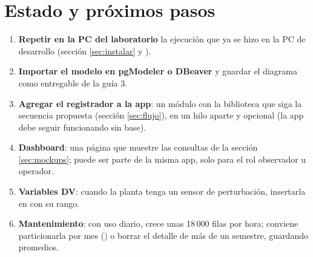 \documentclass[a4paper,11pt]{article}
\begin{document}
\section{Estado y próximos pasos}
\begin{enumerate}
\item \textbf{Repetir en la PC del laboratorio} la ejecución que ya se hizo en la PC de desarrollo (sección \ref{sec:instalar} y ).
\item \textbf{Importar el modelo en pgModeler o DBeaver} y guardar el diagrama como entregable de la guía 3.
\item \textbf{Agregar el registrador a la app}: un módulo con la biblioteca  que siga la secuencia propuesta (sección \ref{sec:flujo}), en un hilo aparte y opcional (la app debe seguir funcionando sin base).
\item \textbf{Dashboard}: una página que muestre las consultas de la sección \ref{sec:mockups}; puede ser parte de la misma app, solo para el rol observador u operador.
\item \textbf{Variables DV}: cuando la planta tenga un sensor de perturbación, insertarla en  con su rango.
\item \textbf{Mantenimiento}: con uso diario,  crece unas 18\,000 filas por hora; conviene particionarla por mes () o borrar el detalle de más de un semestre, guardando promedios.
\end{enumerate}
\end{document}
